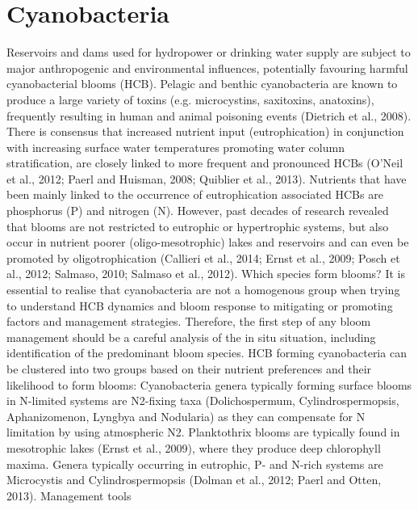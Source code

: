 \section{Cyanobacteria}
\label{sec:1}
Reservoirs and dams used for hydropower or drinking water supply are subject to major anthropogenic and environmental influences, potentially favouring harmful cyanobacterial blooms (HCB). Pelagic and benthic cyanobacteria are known to produce a large variety of toxins (e.g. microcystins, saxitoxins, anatoxins), frequently resulting in human and animal poisoning events (Dietrich et al., 2008). There is consensus that increased nutrient input (eutrophication) in conjunction with increasing surface water temperatures promoting water column stratification, are closely linked to more frequent and pronounced HCBs (O’Neil et al., 2012; Paerl and Huisman, 2008; Quiblier et al., 2013). Nutrients that have been mainly linked to the occurrence of eutrophication associated HCBs are phosphorus (P) and nitrogen (N). However, past decades of research revealed that blooms are not restricted to eutrophic or hypertrophic systems, but also occur in nutrient poorer (oligo-mesotrophic) lakes and reservoirs and can even be promoted by oligotrophication (Callieri et al., 2014; Ernst et al., 2009; Posch et al., 2012; Salmaso, 2010; Salmaso et al., 2012).
Which species form blooms?
It is essential to realise that cyanobacteria are not a homogenous group when trying to understand HCB dynamics and bloom response to mitigating or promoting factors and management strategies. Therefore, the first step of any bloom management should be a careful analysis of the in situ situation, including identification of the predominant bloom species. HCB forming cyanobacteria can be clustered into two groups based on their nutrient preferences and their likelihood to form blooms: Cyanobacteria genera typically forming surface blooms in N-limited systems are N2-fixing taxa (Dolichospermum, Cylindrospermopsis, Aphanizomenon, Lyngbya and Nodularia) as they can compensate for N limitation by using atmospheric N2. Planktothrix blooms are typically found in mesotrophic lakes (Ernst et al., 2009), where they produce deep chlorophyll maxima. Genera typically occurring in eutrophic, P- and N-rich systems are Microcystis and Cylindrospermopsis (Dolman et al., 2012; Paerl and Otten, 2013).
Management tools
